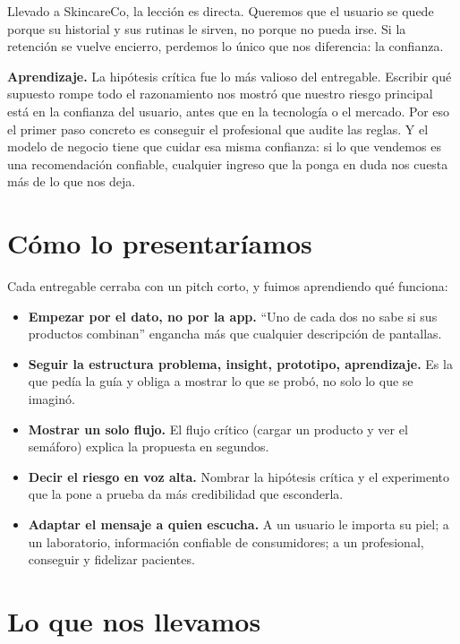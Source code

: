 \documentclass[11pt,a4paper]{article}
\newcommand{\clave}[1]{%
  \par\smallskip\noindent
  \colorbox{suave}{\begin{minipage}{\dimexpr\linewidth-2\fboxsep\relax}
  \textbf{\color{acento}Aprendizaje.} #1
  \end{minipage}}\par\smallskip}
\begin{document}
Llevado a SkincareCo, la lección es directa. Queremos que el usuario se quede porque su historial y sus rutinas le sirven, no porque no pueda irse. Si la retención se vuelve encierro, perdemos lo único que nos diferencia: la confianza.

\clave{La hipótesis crítica fue lo más valioso del entregable. Escribir qué supuesto rompe todo el razonamiento nos mostró que nuestro riesgo principal está en la confianza del usuario, antes que en la tecnología o el mercado. Por eso el primer paso concreto es conseguir el profesional que audite las reglas. Y el modelo de negocio tiene que cuidar esa misma confianza: si lo que vendemos es una recomendación confiable, cualquier ingreso que la ponga en duda nos cuesta más de lo que nos deja.}

\section{Cómo lo presentaríamos}

Cada entregable cerraba con un pitch corto, y fuimos aprendiendo qué funciona:

\begin{itemize}
  \item \textbf{Empezar por el dato, no por la app.} ``Uno de cada dos no sabe si sus productos combinan'' engancha más que cualquier descripción de pantallas.
  \item \textbf{Seguir la estructura problema, insight, prototipo, aprendizaje.} Es la que pedía la guía y obliga a mostrar lo que se probó, no solo lo que se imaginó.
  \item \textbf{Mostrar un solo flujo.} El flujo crítico (cargar un producto y ver el semáforo) explica la propuesta en segundos.
  \item \textbf{Decir el riesgo en voz alta.} Nombrar la hipótesis crítica y el experimento que la pone a prueba da más credibilidad que esconderla.
  \item \textbf{Adaptar el mensaje a quien escucha.} A un usuario le importa su piel; a un laboratorio, información confiable de consumidores; a un profesional, conseguir y fidelizar pacientes.
\end{itemize}

\section{Lo que nos llevamos}
\end{document}
